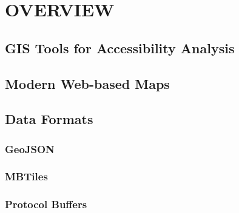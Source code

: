 \section{ OVERVIEW }

\subsection{ GIS Tools for Accessibility Analysis }
\subsection{ Modern Web-based Maps }
\subsection{ Data Formats }
\subsubsection{ GeoJSON }
\subsubsection{ MBTiles }
\subsubsection{ Protocol Buffers }


